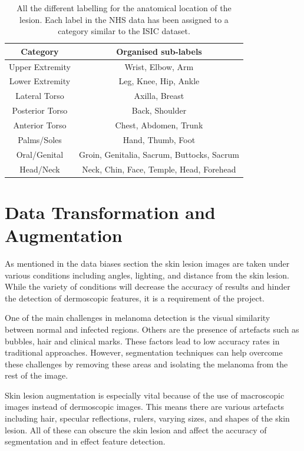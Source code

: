 \begin{table}
	\centering
	\begin{tabular}{|c|c|}
		Category        & Organised sub-labels
		\\
		\hline
		Upper Extremity & Wrist, Elbow, Arm
		\\
		\hline
		Lower Extremity & Leg, Knee, Hip, Ankle
		\\
		\hline
		Lateral Torso   & Axilla, Breast
		\\
		\hline
		Posterior Torso & Back, Shoulder
		\\
		\hline
		Anterior Torso  & Chest, Abdomen, Trunk
		\\
		\hline
		Palms/Soles     & Hand, Thumb, Foot
		\\
		\hline
		Oral/Genital    & Groin, Genitalia, Sacrum, Buttocks, Sacrum
		\\
		\hline
		Head/Neck       & Neck, Chin, Face, Temple, Head, Forehead
		\\
		\hline
	\end{tabular}
	\caption{All the different labelling for the anatomical location of the lesion. Each label in the NHS data has been assigned to a category similar to the ISIC dataset.}
\end{table}\label{nhs-location-names}


\section{Data Transformation and Augmentation}
As mentioned in the data biases section the skin lesion images are taken under various conditions including angles, lighting, and distance from the skin lesion. While the variety of conditions will decrease the accuracy of results and hinder the detection of dermoscopic features, it is a requirement of the project.

One of the main challenges in melanoma detection is the visual similarity between normal and infected regions. Others are the presence of artefacts such as bubbles, hair and clinical marks\cite{Albahli2020}. These factors lead to low accuracy rates in traditional approaches. However, segmentation techniques can help overcome these challenges by removing these areas and isolating the melanoma from the rest of the image.

Skin lesion augmentation is especially vital because of the use of macroscopic images instead of dermoscopic images. This means there are various artefacts including hair, specular reflections, rulers, varying sizes, and shapes of the skin lesion. All of these can obscure the skin lesion and affect the accuracy of segmentation\cite{Unver2019} and in effect feature detection.

